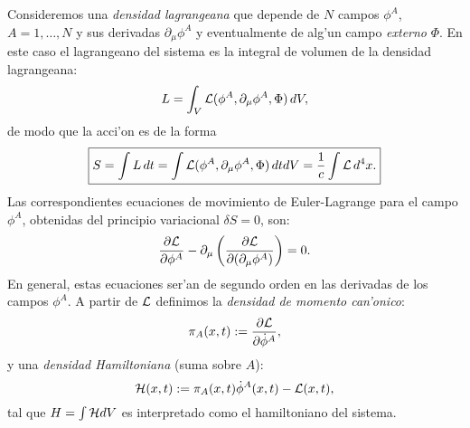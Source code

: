  Consideremos una \textit{densidad lagrangeana} que depende de $N$ campos $\phi^A$,
$A=1,\dots ,N$ y sus derivadas $\partial_\mu \phi^A$ y eventualmente de alg'un
campo {\em externo} $\Phi$. En este caso el lagrangeano del sistema es la
integral de volumen de la densidad lagrangeana:
\begin{equation}
L=\int_V {\cal L}(\phi^A,\partial_\mu\phi^A,\Phi)\, dV ,\label{lag4d}
\end{equation}
de modo que la acci'on es de la forma
\begin{equation}
\boxed{S=\int L\, dt= \int {\cal L}(\phi^A,\partial_\mu\phi^A,\Phi)\, dt dV=
\frac{1}{c}\int {\cal L}\,d^4x.}
\end{equation}
 Las correspondientes ecuaciones de movimiento de Euler-Lagrange para el campo
$\phi^A$, obtenidas del principio variacional $\delta S=0$, son:
\begin{equation}
\frac{\partial {\cal L}}{\partial \phi ^{A}}-\partial _{\mu }\left(
\frac{\partial {\cal L}}{\partial (\partial_{\mu }\phi^{A})}\right)=0.
\label{eccont2}
\end{equation}
En general, estas ecuaciones ser'an de segundo orden en las derivadas de los
campos $\phi^A$. A partir de $\cal L$ definimos la \textit{densidad de momento
can'onico}:
\begin{equation}
\pi_A(x,t)  := \frac{\partial{\cal L}}{\partial\dot{\phi}^A},
\label{DensidadMomentoCanonicoConjugado}
\end{equation}
 y una \textit{densidad Hamiltoniana} (suma sobre $A$):
 \begin{equation}
{\cal H}(x,t) := \pi_A(x,t) \dot{\phi}^A(x,t)-{\cal L}(x,t) ,
\label{DensidadHamiltoniana}
\end{equation}
tal que $H=\int {\cal H}dV$ es interpretado como el hamiltoniano del sistema.


